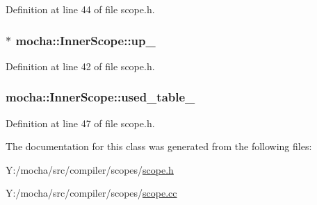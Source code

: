Definition at line 44 of file scope.h.

\hypertarget{classmocha_1_1_inner_scope_afdd97c6336ee4055e4a6808c0f703ed5}{
\subsubsection[{up\_\-}]{$\ast$ {\bf mocha::InnerScope::up\_\-}}}
\label{classmocha_1_1_inner_scope_afdd97c6336ee4055e4a6808c0f703ed5}


Definition at line 42 of file scope.h.

\hypertarget{classmocha_1_1_inner_scope_a099bcce3df3cfcb1bff30811156f88c3}{
\subsubsection[{used\_\-table\_\-}]{ {\bf mocha::InnerScope::used\_\-table\_\-}}}
\label{classmocha_1_1_inner_scope_a099bcce3df3cfcb1bff30811156f88c3}


Definition at line 47 of file scope.h.



The documentation for this class was generated from the following files:\begin{DoxyCompactItemize}
\item 
Y:/mocha/src/compiler/scopes/\hyperlink{scope_8h}{scope.h}\item 
Y:/mocha/src/compiler/scopes/\hyperlink{scope_8cc}{scope.cc}\end{DoxyCompactItemize}
